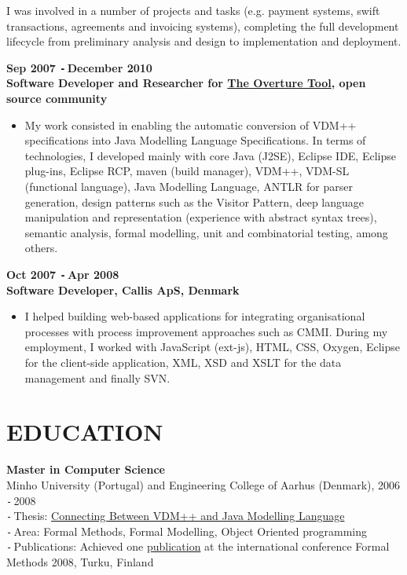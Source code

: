 \documentclass{res}
\def\Minus{\texttt{-}\,}
\begin{document}
\begin{resume}
\begin{itemize}
        I was involved in a number of projects and tasks (e.g. payment systems, swift transactions, agreements and invoicing systems), completing the full development lifecycle from preliminary analysis and design to implementation and deployment.
       \end{itemize}

  {\bf Sep 2007 \Minus December 2010}\\
  {\bf Software Developer and Researcher for \href{http://www.overturetool.org}{The Overture Tool}, open source community}
        \begin{itemize}
        \item[] My work consisted in enabling the automatic conversion of VDM++ specifications into Java Modelling Language Specifications. In terms of technologies, I developed mainly with core Java (J2SE), Eclipse IDE, Eclipse plug-ins, Eclipse RCP, maven (build manager), VDM++, VDM-SL (functional language), Java Modelling Language, ANTLR for parser generation, design patterns such as the Visitor Pattern, deep language manipulation and representation (experience with abstract syntax trees), semantic analysis, formal modelling, unit and combinatorial testing, among others.
       \end{itemize}

  {\bf Oct 2007 \Minus Apr 2008}\\
  {\bf Software Developer, Callis ApS, Denmark}
        \begin{itemize}
        \item[] I helped building web-based applications for integrating organisational processes with process improvement approaches such as CMMI.
During my employment, I worked with JavaScript (ext-js), HTML, CSS, Oxygen, Eclipse for the client-side application, XML, XSD and XSLT for the data management and finally SVN.
        \end{itemize}

\section{EDUCATION}
\vspace{0.1in}

    {\bf Master in Computer Science}\\
    Minho University (Portugal) and Engineering College of Aarhus (Denmark), 2006 \Minus 2008\\
    \Minus Thesis: \href{http://wiki.overturetool.org/images/4/44/ConnectingVDMppJML.pdf}{Connecting Between VDM++ and Java Modelling Language}\\
    \Minus Area: Formal Methods, Formal Modelling, Object Oriented programming\\
    \Minus Publications: Achieved one \href{http://www.cs.ncl.ac.uk/publications/trs/papers/1099.pdf}{publication} at the international conference Formal Methods 2008, Turku, Finland


\end{resume}
\end{document}
